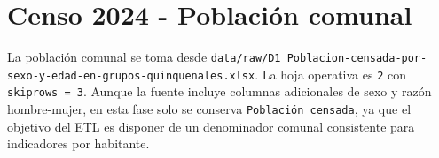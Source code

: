 \section{Censo 2024 - Población comunal}

La población comunal se toma desde \texttt{data/raw/D1\_Poblacion-censada-por-sexo-y-edad-en-grupos-quinquenales.xlsx}. La hoja operativa es \texttt{2} con \texttt{skiprows = 3}. Aunque la fuente incluye columnas adicionales de sexo y razón hombre-mujer, en esta fase solo se conserva \texttt{Población censada}, ya que el objetivo del ETL es disponer de un denominador comunal consistente para indicadores por habitante.
